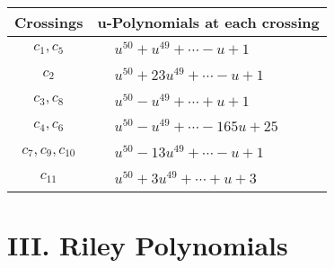 \documentclass[1p]{elsarticle_modified}
\theoremstyle{definition}
\begin{document}
\begin{tabular}{m{50pt}|m{274pt}}
Crossings & \hspace{64pt}u-Polynomials at each crossing \\
\hline $$\begin{aligned}c_{1},c_{5}\end{aligned}$$&$\begin{aligned}
&u^{50}+u^{49}+\cdots- u+1
\end{aligned}$\\
\hline $$\begin{aligned}c_{2}\end{aligned}$$&$\begin{aligned}
&u^{50}+23 u^{49}+\cdots- u+1
\end{aligned}$\\
\hline $$\begin{aligned}c_{3},c_{8}\end{aligned}$$&$\begin{aligned}
&u^{50}- u^{49}+\cdots+u+1
\end{aligned}$\\
\hline $$\begin{aligned}c_{4},c_{6}\end{aligned}$$&$\begin{aligned}
&u^{50}- u^{49}+\cdots-165 u+25
\end{aligned}$\\
\hline $$\begin{aligned}c_{7},c_{9},c_{10}\end{aligned}$$&$\begin{aligned}
&u^{50}-13 u^{49}+\cdots- u+1
\end{aligned}$\\
\hline $$\begin{aligned}c_{11}\end{aligned}$$&$\begin{aligned}
&u^{50}+3 u^{49}+\cdots+u+3
\end{aligned}$\\
\hline
\end{tabular}\newpage\renewcommand{\arraystretch}{1}
\centering \section*{ III. Riley Polynomials}
\end{document}

